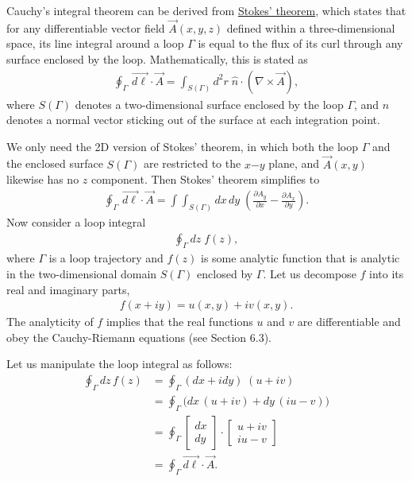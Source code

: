 \documentclass[10pt,a4paper]{article}
\begin{document}
Cauchy's integral theorem can be derived from
\href{http://en.wikipedia.org/wiki/Stokes'_theorem}{Stokes' theorem},
which states that for any differentiable vector field $\vec{A}(x,y,z)$
defined within a three-dimensional space, its line integral around a
loop $\Gamma$ is equal to the flux of its curl through any surface
enclosed by the loop.  Mathematically, this is stated as
\begin{align}
  \oint_\Gamma\, \vec{d\ell} \cdot \vec{A} = \int_{S(\Gamma)} d^2r \; \hat{n} \cdot \left(\nabla \times \vec{A}\right),
\end{align}
where $S(\Gamma)$ denotes a two-dimensional surface enclosed by the
loop $\Gamma$, and $\hat{n}$ denotes a normal vector sticking out of
the surface at each integration point.

We only need the 2D version of Stokes' theorem, in which both the loop
$\Gamma$ and the enclosed surface $S(\Gamma)$ are restricted to the
$x\mathrm{-}y$ plane, and $\vec{A}(x,y)$ likewise has no $z$
component.  Then Stokes' theorem simplifies to
\begin{align}
  \oint_\Gamma\, \vec{d\ell} \cdot \vec{A} = \int\!\!\!\int_{S(\Gamma)}\! dx \,dy \; \left(\frac{\partial A_y}{\partial x} - \frac{\partial A_x}{\partial y}\right).
\end{align}
Now consider a loop integral
\begin{align*}
  \oint_\Gamma dz \; f(z),
\end{align*}
where $\Gamma$ is a loop trajectory and $f(z)$ is some analytic
function that is analytic in the two-dimensional domain $S(\Gamma)$
enclosed by $\Gamma$. Let us decompose $f$ into its real and imaginary
parts,
\begin{align}
  f(x+iy) = u(x,y) + iv(x,y).
\end{align}
The analyticity of $f$ implies that the real functions $u$ and $v$ are
differentiable and obey the Cauchy-Riemann equations (see Section
6.3).

Let us manipulate the loop integral as follows:
\begin{align}
  \oint_\Gamma dz \, f(z) &= \oint_\Gamma \left(dx + i dy\right) \; \left(u + i v\right) \\
  &= \oint_\Gamma \Bigg(dx\, (u+iv) + dy\, (iu - v) \Bigg)  \\
  &= \oint_\Gamma \begin{bmatrix}dx\\dy\end{bmatrix} \cdot \begin{bmatrix}u + i v \\ iu - v\end{bmatrix}\\
      &= \oint_\Gamma \vec{d\ell} \cdot \vec{A}.
\end{align}
\end{document}
